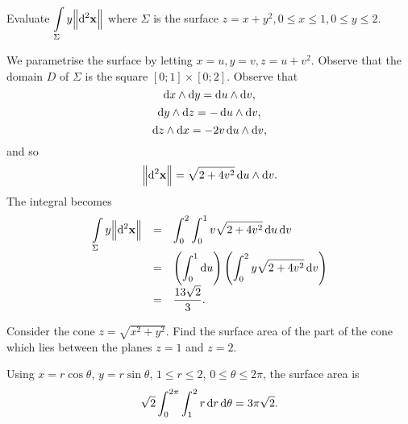 \section*{}
\begin{problem}
Evaluate $\dint \limits_\Sigma y \norm{\d{ ^2\vector{x}}}$ where
$\Sigma$ is the surface $z = x + y^2, 0 \leq x \leq 1, 0 \leq y \leq
2.$ \begin{answer} We parametrise the surface by letting $x = u, y =
v, z = u + v^2.$ Observe that the domain $D$ of $\Sigma$ is the
square $[0; 1]\times [0; 2]$. Observe that
$$\d{x} \wedge \d{y}
=   \d{u} \wedge \d{v} ,$$
$$\d{y} \wedge \d{z} = -\d{u} \wedge \d{v}, $$
$$\d{z} \wedge \d{x} = -2v\d{u} \wedge \d{v},
$$and so
$$\norm{\d{ ^2\vector{x}}} = \sqrt{2 + 4v^2}\d{u} \wedge \d{v}.$$
The integral becomes
$$\begin{array}{lll}
\dint \limits_\Sigma y \norm{\d{ ^2\vector{x}}} & = & \dint_0 ^2\dint _0
^1
v\sqrt{2 + 4v^2}\d{u}\d{v} \\
& = & \left(\dint_0 ^1 \d{u}\right) \left(\dint_0 ^2 y\sqrt{2 +
4v^2}\d{v}\right) \\
& = & \dfrac{13\sqrt{2}}{3}.
\end{array}$$
\end{answer}
\end{problem}
\begin{problem}
Consider the cone $z = \sqrt{x^2+y^2}$. Find the surface area of the
part of the cone which lies between the planes $z = 1$ and $z = 2$.
\begin{answer}
Using $x=r\cos \theta$, $y=r\sin \theta$, $1\leq r \leq 2$, $0 \leq
\theta \leq 2\pi$, the surface area is
$$ \sqrt{2}\dint _0  ^{2\pi}\dint _1 ^2 r\d{r}\d{\theta}=3\pi\sqrt{2}.  $$
\end{answer}
\end{problem}

